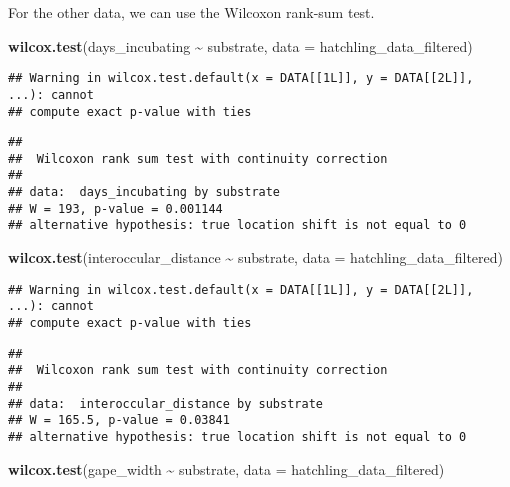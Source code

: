 \documentclass[
]{article}
\newenvironment{Shaded}{\begin{snugshade}}{\end{snugshade}}
\newcommand{\AttributeTok}[1]{\textcolor[rgb]{0.13,0.29,0.53}{#1}}
\newcommand{\FunctionTok}[1]{\textcolor[rgb]{0.13,0.29,0.53}{\textbf{#1}}}
\newcommand{\NormalTok}[1]{#1}
\newcommand{\SpecialCharTok}[1]{\textcolor[rgb]{0.81,0.36,0.00}{\textbf{#1}}}
\begin{document}
For the other data, we can use the Wilcoxon rank-sum test.

\begin{Shaded}
\begin{Highlighting}[]
\FunctionTok{wilcox.test}\NormalTok{(days\_incubating }\SpecialCharTok{\textasciitilde{}}\NormalTok{ substrate, }\AttributeTok{data =}\NormalTok{ hatchling\_data\_filtered)}
\end{Highlighting}
\end{Shaded}

\begin{verbatim}
## Warning in wilcox.test.default(x = DATA[[1L]], y = DATA[[2L]], ...): cannot
## compute exact p-value with ties
\end{verbatim}

\begin{verbatim}
## 
##  Wilcoxon rank sum test with continuity correction
## 
## data:  days_incubating by substrate
## W = 193, p-value = 0.001144
## alternative hypothesis: true location shift is not equal to 0
\end{verbatim}

\begin{Shaded}
\begin{Highlighting}[]
\FunctionTok{wilcox.test}\NormalTok{(interoccular\_distance }\SpecialCharTok{\textasciitilde{}}\NormalTok{ substrate, }\AttributeTok{data =}\NormalTok{ hatchling\_data\_filtered)}
\end{Highlighting}
\end{Shaded}

\begin{verbatim}
## Warning in wilcox.test.default(x = DATA[[1L]], y = DATA[[2L]], ...): cannot
## compute exact p-value with ties
\end{verbatim}

\begin{verbatim}
## 
##  Wilcoxon rank sum test with continuity correction
## 
## data:  interoccular_distance by substrate
## W = 165.5, p-value = 0.03841
## alternative hypothesis: true location shift is not equal to 0
\end{verbatim}

\begin{Shaded}
\begin{Highlighting}[]
\FunctionTok{wilcox.test}\NormalTok{(gape\_width }\SpecialCharTok{\textasciitilde{}}\NormalTok{ substrate, }\AttributeTok{data =}\NormalTok{ hatchling\_data\_filtered)}
\end{Highlighting}
\end{Shaded}
\end{document}
